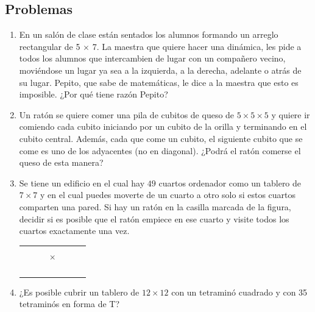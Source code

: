 \subsection{Problemas}

\begin{enumerate}
	\item En un sal\'on de clase est\'an sentados los alumnos formando un arreglo rectangular de 5 $\times$ 7. La maestra
	que quiere hacer una din\'amica, les pide a todos los alumnos que intercambien de lugar con un compañero
	vecino, movi\'endose un lugar ya sea a la izquierda, a la derecha, adelante o atr\'as de su lugar. Pepito, que
	sabe de matem\'aticas, le dice a la maestra que esto es imposible. ¿Por qu\'e tiene raz\'on Pepito?
	\item Un rat\'on se quiere comer una pila de cubitos de queso de $5\times5\times5$ y quiere ir comiendo cada cubito iniciando por un cubito de la orilla y
	terminando en el cubito central. Adem\'as, cada que come un cubito, el siguiente cubito que se come es uno
	de los adyacentes (no en diagonal). ¿Podr\'a el rat\'on comerse el queso de esta manera?
	
	\item Se tiene un edificio en el cual hay $49$ cuartos ordenador como un tablero de $7 \times 7$ y en el cual puedes moverte de un cuarto a otro solo si estos cuartos comparten una pared. Si hay un rat\'on en la casilla marcada de la figura, decidir si es posible que el rat\'on empiece en ese cuarto y visite todos los cuartos exactamente una vez.
	
	\begin{center}
		\begin{tabular}{|m{.25cm} | m{.25cm} | m{.25cm} | m{.25cm} | m{.25cm} | m{.25cm} | m{.25cm}|}
			\hline
			& & & & & & \\
			\hline
			& & & & & & \\
			\hline
			& & & $ \times$ & & & \\
			\hline
			& & & & & & \\
			\hline
			& & & & & & \\
			\hline
			& & & & & & \\
			\hline
			& & & & & & \\
			\hline
		\end{tabular}
	\end{center}

	\item ¿Es posible cubrir un tablero de $12\times 12$ con un tetramin\'o cuadrado y con 35 tetramin\'os en forma de T?
	

\end{enumerate}
